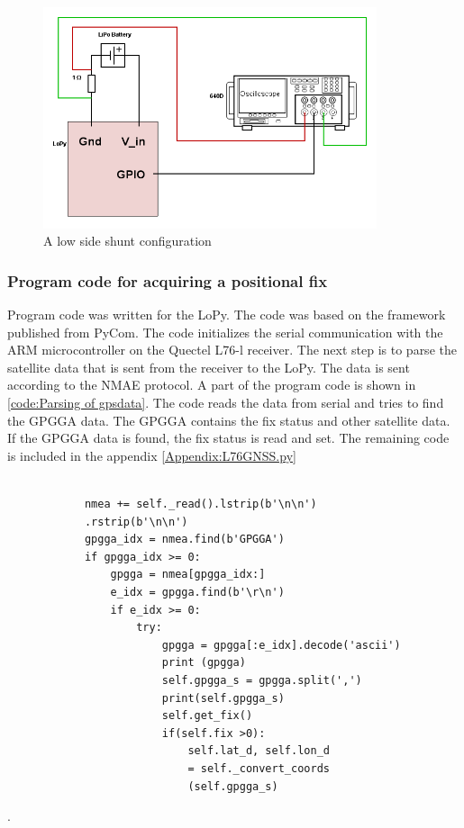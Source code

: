\begin{figure}[H]
\centering
\includegraphics[height=6.5cm]{Project_Report/Images/LoPy_Schematic.png}
\caption{A low side shunt configuration}
\label{fig:LoPy_Schematic}
\end{figure}


\subsubsection{Program code for acquiring a positional fix}
Program code was written for the LoPy. The code was based on the framework published from PyCom. The code initializes the serial communication with the ARM microcontroller on the Quectel L76-l receiver. The next step is to parse the satellite data that is sent from the receiver to the LoPy. The data is sent according to the NMAE protocol. A part of the program code is shown in \ref{code:Parsing of gpsdata}. The code reads the data from serial and tries to find the GPGGA data. The GPGGA contains the fix status and other satellite data. If the GPGGA data is found, the fix status is read and set. The remaining code is included in the appendix \ref{Appendix:L76GNSS.py}

\lstset{language=Python}          %

\begin{lstlisting}[frame=single]  % Start your code-block

            nmea += self._read().lstrip(b'\n\n')
            .rstrip(b'\n\n')
            gpgga_idx = nmea.find(b'GPGGA')
            if gpgga_idx >= 0:
                gpgga = nmea[gpgga_idx:]
                e_idx = gpgga.find(b'\r\n')
                if e_idx >= 0:
                    try:
                        gpgga = gpgga[:e_idx].decode('ascii')
                        print (gpgga)
                        self.gpgga_s = gpgga.split(',')
                        print(self.gpgga_s)
                        self.get_fix()
                        if(self.fix >0):
                            self.lat_d, self.lon_d
                            = self._convert_coords
                            (self.gpgga_s)
\end{lstlisting}
\label{code:Parsing of gpsdata}









.
\newpage